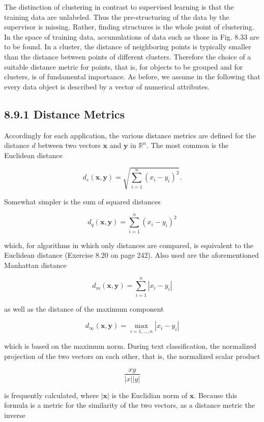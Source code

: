 \documentclass[10pt]{book}
\begin{document}
\begin{center}
\begin{enumerate}
\begin{center}
\begin{center}
\begin{center}
The distinction of clustering in contrast to supervised learning is that the training data are unlabeled. Thus the pre-structuring of the data by the supervisor is missing. Rather, finding structures is the whole point of clustering. In the space of training data, accumulations of data such as those in Fig. 8.33 are to be found. In a cluster, the distance of neighboring points is typically smaller than the distance between points of different clusters. Therefore the choice of a suitable distance metric for points, that is, for objects to be grouped and for clusters, is of fundamental importance. As before, we assume in the following that every data object is described by a vector of numerical attributes.

\subsection*{8.9.1 Distance Metrics}
Accordingly for each application, the various distance metrics are defined for the distance $d$ between two vectors $\boldsymbol{x}$ and $\boldsymbol{y}$ in $\mathbb{R}^{n}$. The most common is the Euclidean distance

$$
d_{e}(\boldsymbol{x}, \boldsymbol{y})=\sqrt{\sum_{i=1}^{n}\left(x_{i}-y_{i}\right)^{2}} .
$$

Somewhat simpler is the sum of squared distances

$$
d_{q}(\boldsymbol{x}, \boldsymbol{y})=\sum_{i=1}^{n}\left(x_{i}-y_{i}\right)^{2}
$$

which, for algorithms in which only distances are compared, is equivalent to the Euclidean distance (Exercise 8.20 on page 242). Also used are the aforementioned Manhattan distance

$$
d_{m}(\boldsymbol{x}, \boldsymbol{y})=\sum_{i=1}^{n}\left|x_{i}-y_{i}\right|
$$

as well as the distance of the maximum component

$$
d_{\infty}(\boldsymbol{x}, \boldsymbol{y})=\max _{i=1, \ldots, n}\left|x_{i}-y_{i}\right|
$$

which is based on the maximum norm. During text classification, the normalized projection of the two vectors on each other, that is, the normalized scalar product

$$
\frac{x y}{|x||y|}
$$

is frequently calculated, where $|\boldsymbol{x}|$ is the Euclidian norm of $\boldsymbol{x}$. Because this formula is a metric for the similarity of the two vectors, as a distance metric the inverse


\end{center}
\end{center}
\end{center}
\end{enumerate}
\end{center}
\end{document}
